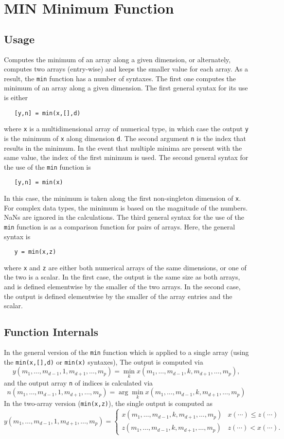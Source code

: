 \section{MIN Minimum Function}

\subsection{Usage}

Computes the minimum of an array along a given dimension, or alternately, 
computes two arrays (entry-wise) and keeps the smaller value for each array.
As a result, the \verb|min| function has a number of syntaxes.  The first
one computes the minimum of an array along a given dimension.
The first general syntax for its use is either
\begin{verbatim}
   [y,n] = min(x,[],d)
\end{verbatim}
where \verb|x| is a multidimensional array of numerical type, in which case the
output \verb|y| is the minimum of \verb|x| along dimension \verb|d|.  
The second argument \verb|n| is the index that results in the minimum.
In the event that multiple minima are present with the same value,
the index of the first minimum is used. 
The second general syntax for the use of the \verb|min| function is
\begin{verbatim}
   [y,n] = min(x)
\end{verbatim}
In this case, the minimum is taken along the first non-singleton 
dimension of \verb|x|.  For complex data types,
the minimum is based on the magnitude of the numbers.  NaNs are
ignored in the calculations.
The third general syntax for the use of the \verb|min| function is as 
a comparison function for pairs of arrays.  Here, the general syntax is
\begin{verbatim}
   y = min(x,z)
\end{verbatim}
where \verb|x| and \verb|z| are either both numerical arrays of the same dimensions,
or one of the two is a scalar.  In the first case, the output is the 
same size as both arrays, and is defined elementwise by the smaller of the
two arrays.  In the second case, the output is defined elementwise by the 
smaller of the array entries and the scalar.
\subsection{Function Internals}

In the general version of the \verb|min| function which is applied to
a single array (using the \verb|min(x,[],d)| or \verb|min(x)| syntaxes),
The output is computed via
\[
y(m_1,\ldots,m_{d-1},1,m_{d+1},\ldots,m_{p}) = 
\min_{k} x(m_1,\ldots,m_{d-1},k,m_{d+1},\ldots,m_{p}),
\]
and the output array \verb|n| of indices is calculated via
\[
n(m_1,\ldots,m_{d-1},1,m_{d+1},\ldots,m_{p}) = \arg
\min_{k} x(m_1,\ldots,m_{d-1},k,m_{d+1},\ldots,m_{p})
\]
In the two-array version (\verb|min(x,z)|), the single output is computed as
\[
  y(m_1,\ldots,m_{d-1},1,m_{d+1},\ldots,m_{p}) = 
\begin{cases}
  x(m_1,\ldots,m_{d-1},k,m_{d+1},\ldots,m_{p}) & x(\cdots) \leq z(\cdots) \\   z(m_1,\ldots,m_{d-1},k,m_{d+1},\ldots,m_{p}) & z(\cdots) < x(\cdots).
\end{cases}
\]
